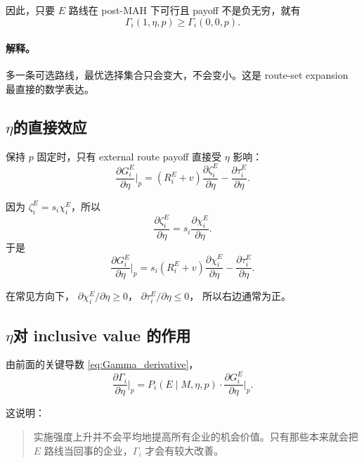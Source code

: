 \documentclass[12pt,UTF8]{ctexart}
\theoremstyle{plain}
\theoremstyle{remark}
\begin{document}
因此，只要 $E$ 路线在 post-MAH 下可行且 payoff 不是负无穷，就有
\begin{equation}
\Gamma_i(1,\eta,p)\ge \Gamma_i(0,0,p).
\label{eq:route_set_expansion}
\end{equation}

\paragraph{解释。}
多一条可选路线，最优选择集合只会变大，不会变小。这是 route-set expansion
最直接的数学表达。

\subsection{\texorpdfstring{$\eta$}{实施强度}的直接效应}

保持 $p$ 固定时，只有 external route payoff 直接受 $\eta$ 影响：
\begin{equation}
\frac{\partial G_i^E}{\partial \eta}\Big|_{p}
=
(R_i^E+v)\frac{\partial \zeta_i^E}{\partial \eta}
-\frac{\partial \tau_i^E}{\partial \eta}.
\label{eq:dGE_deta_partial}
\end{equation}

因为 $\zeta_i^E=s_i\chi_i^E$，所以
\[
\frac{\partial \zeta_i^E}{\partial \eta}
=
s_i\frac{\partial \chi_i^E}{\partial \eta}.
\]
于是
\begin{equation}
\frac{\partial G_i^E}{\partial \eta}\Big|_{p}
=
s_i(R_i^E+v)\frac{\partial \chi_i^E}{\partial \eta}
-\frac{\partial \tau_i^E}{\partial \eta}.
\label{eq:dGE_deta_partial2}
\end{equation}

在常见方向下，
$\partial\chi_i^E/\partial\eta\ge 0$，
$\partial\tau_i^E/\partial\eta\le 0$，
所以右边通常为正。

\subsection{\texorpdfstring{$\eta$}{实施强度}对 inclusive value 的作用}

由前面的关键导数 \eqref{eq:Gamma_derivative}，
\begin{equation}
\frac{\partial \Gamma_i}{\partial \eta}\Big|_{p}
=
P_i(E\mid M,\eta,p)\cdot
\frac{\partial G_i^E}{\partial \eta}\Big|_{p}.
\label{eq:dGamma_deta_partial}
\end{equation}

这说明：

\begin{quote}
实施强度上升并不会平均地提高所有企业的机会价值。只有那些本来就会把
$E$ 路线当回事的企业，$\Gamma_i$ 才会有较大改善。
\end{quote}
\end{document}
